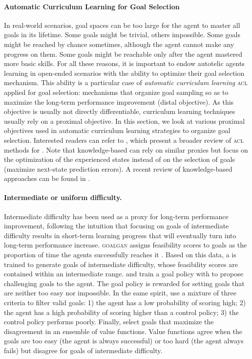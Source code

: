 \paragraph{Automatic Curriculum Learning for Goal Selection}
In real-world scenarios, goal spaces can be too large for the agent to master all goals in its lifetime. Some goals might be trivial, others impossible. Some goals might be reached by chance sometimes, although the agent cannot make any progress on them. Some goals might be reachable only after the agent mastered more basic skills. For all these reasons, it is important to endow autotelic agents learning in open-ended scenarios with the ability to optimize their goal selection mechanism. This ability is a particular case of \textit{automatic curriculum learning} \textsc{acl} applied for goal selection: mechanisms that organize goal sampling so as to maximize the long-term performance improvement (distal objective). As this objective is usually not directly differentiable, curriculum learning techniques usually rely on a proximal objective. In this section, we look at various proximal objectives used in automatic curriculum learning strategies to organize goal selection. Interested readers can refer to \cite{portelas2020automatic}, which present a broader review of \textsc{acl} methods for \rl. Note that knowledge-based \ims can rely on similar proxies but focus on the optimization of the experienced states instead of on the selection of goals (\eg maximize next-state prediction errors). A recent review of knowledge-based \im approaches can be found in \cite{linke2019adapting}.


\paragraph{Intermediate or uniform difficulty.} Intermediate difficulty has been used as a proxy for long-term performance improvement, following the intuition that focusing on goals of intermediate difficulty results in short-term learning progress that will eventually turn into long-term performance increase. \textsc{goalgan} assigns feasibility scores to goals as the proportion of time the agents successfully reaches it \cite{goalgan}. Based on this data, a \gan is trained to generate goals of intermediate difficulty, whose feasibility scores are contained within an intermediate range. \cite{sukhbaatar2017intrinsic} and \cite{campero2020learning} train a goal policy with \rl to propose challenging goals to the \rl agent. The goal policy is rewarded for setting goals that are neither too easy nor impossible. In the same spirit, \cite{team2021open} use a mixture of three criteria to filter valid goals: 1) the agent has a low probability of scoring high; 2) the agent has a high probability of scoring higher than a control policy; 3) the control policy performs poorly. Finally, \cite{zhang2020automatic} select goals that maximize the disagreement in an ensemble of value functions. Value functions agree when the goals are too easy (the agent is always successful) or too hard (the agent always fails) but disagree for goals of intermediate difficulty.

